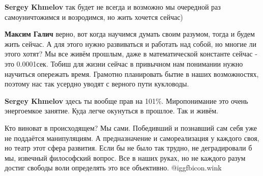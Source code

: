  
\textbf{Sergey Khmelov} так будет не всегда и возможно мы очередной раз самоуничтожимся и возродимся, но жить хочется сейчас)

 
\textbf{Максим Галич} верно, вот когда научимся думать своим разумом, тогда и будем жить сейчас. А для этого нужно развиваться и работать над собой, но многие ли этого хотят? Мы все живём прошлым, даже в математической константе сейчас - это 0.0001сек. Тобиш для жизни сейчас в привычном нам понимании нужно научиться опережать время. Грамотно планировать бытие в наших возможностях, поэтому нас так усердно уводят с верного пути кукловоды.

 
\textbf{Sergey Khmelov} здесь ты вообще прав на 101\%. Миропонимание это очень энергоемкое занятие. Куда легче окунуться в прошлое. Так и живём.

 

Кто виноват в происходящем? Мы сами. Победивший и познавший сам себя уже не
поддаётся манипуляциям. А предназначение и самореализация у каждого своя, но
театр этот сфера развития. Если бы не было так трудно, не деградировали б мы,
извечный философский вопрос. Все в наших руках, но не каждого разум достиг
свободы воли определять это все объективно. @igg{fbicon.wink}

 
